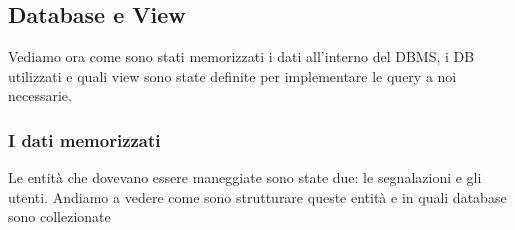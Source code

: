         \subsection{Database e View}
            Vediamo ora come sono stati memorizzati i dati all'interno del 
            DBMS, i DB utilizzati e quali view sono state definite per
            implementare le query a noi necessarie.
            
            \subsubsection{I dati memorizzati}
                Le entità che dovevano essere maneggiate sono state due: le 
                segnalazioni e gli utenti. Andiamo a vedere come sono 
                strutturare queste entità e in quali database sono collezionate
                
